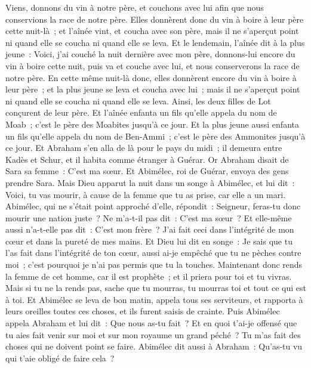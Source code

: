 \begin{multicols}{2}
Viens, donnons du vin à notre père, et couchons avec lui afin que nous conservions la race de notre père.
Elles donnèrent donc du vin à boire à leur père cette nuit-là~; et l'aînée vint, et coucha avec son père, mais il ne s'aperçut point ni quand elle se coucha ni quand elle se leva.
Et le lendemain, l'aînée dit à la plus jeune~: Voici, j'ai couché la nuit dernière avec mon père, donnons-lui encore du vin à boire cette nuit, puis va et couche avec lui, et nous conserverons la race de notre père.
En cette même nuit-là donc, elles donnèrent encore du vin à boire à leur père~; et la plus jeune se leva et coucha avec lui~; mais il ne s'aperçut point ni quand elle se coucha ni quand elle se leva.
Ainsi, les deux filles de Lot conçurent de leur père.
Et l'aînée enfanta un fils qu'elle appela du nom de Moab~; c'est le père des Moabites jusqu'à ce jour.
Et la plus jeune aussi enfanta un fils qu'elle appela du nom de Ben-Ammi~; c'est le père des Ammonites jusqu'à ce jour.
\VerseOne{}Et Abraham s'en alla de là pour le pays du midi~; il demeura entre Kadès et Schur, et il habita comme étranger à Guérar.
Or Abraham disait de Sara sa femme~: C'est ma sœur. Et Abimélec, roi de Guérar, envoya des gens prendre Sara.
Mais Dieu apparut la nuit dans un songe à Abimélec, et lui dit~: Voici, tu vas mourir, à cause de la femme que tu as prise, car elle a un mari.
Abimélec, qui ne s'était point approché d'elle, répondit~: Seigneur, feras-tu donc mourir une nation juste~?
Ne m'a-t-il pas dit~: C'est ma sœur~? Et elle-même aussi n'a-t-elle pas dit~: C'est mon frère~? J'ai fait ceci dans l'intégrité de mon cœur et dans la pureté de mes mains.
Et Dieu lui dit en songe~: Je sais que tu l'as fait dans l'intégrité de ton cœur, aussi ai-je empêché que tu ne pèches contre moi~; c'est pourquoi je n'ai pas permis que tu la touches.
Maintenant donc rends la femme de cet homme, car il est prophète~; et il priera pour toi et tu vivras. Mais si tu ne la rends pas, sache que tu mourras, tu mourras toi et tout ce qui est à toi.
Et Abimélec se leva de bon matin, appela tous ses serviteurs, et rapporta à leurs oreilles toutes ces choses, et ils furent saisis de crainte.
Puis Abimélec appela Abraham et lui dit~: Que nous as-tu fait~? Et en quoi t'ai-je offensé que tu aies fait venir sur moi et sur mon royaume un grand péché~? Tu m'as fait des choses qui ne doivent point se faire.
Abimélec dit aussi à Abraham~: Qu'as-tu vu qui t'aie obligé de faire cela~?

\end{multicols}
